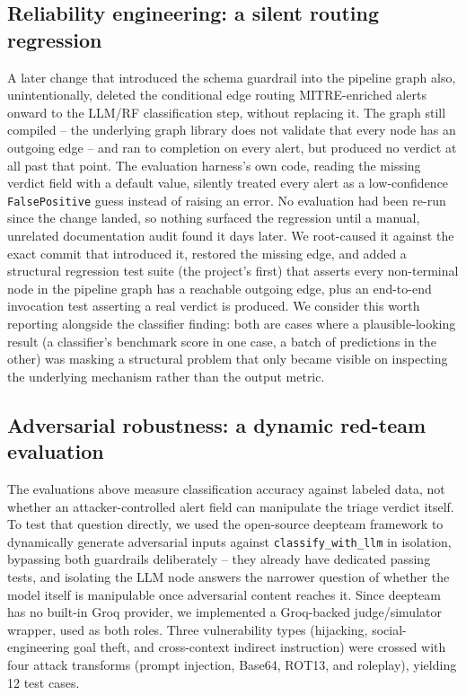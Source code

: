 \documentclass[conference]{IEEEtran}
\begin{document}
\subsection{Reliability engineering: a silent routing regression}

A later change that introduced the schema guardrail into the pipeline graph also, unintentionally,
deleted the conditional edge routing MITRE-enriched alerts onward to the LLM/RF classification
step, without replacing it. The graph still compiled -- the underlying graph library does not
validate that every node has an outgoing edge -- and ran to completion on every alert, but produced
no verdict at all past that point. The evaluation harness's own code, reading the missing verdict
field with a default value, silently treated every alert as a low-confidence \texttt{FalsePositive}
guess instead of raising an error. No evaluation had been re-run since the change landed, so
nothing surfaced the regression until a manual, unrelated documentation audit found it days later.
We root-caused it against the exact commit that introduced it, restored the missing edge, and
added a structural regression test suite (the project's first) that asserts every non-terminal
node in the pipeline graph has a reachable outgoing edge, plus an end-to-end invocation test
asserting a real verdict is produced. We consider this worth reporting alongside the classifier
finding: both are cases where a plausible-looking result (a classifier's benchmark score in one
case, a batch of predictions in the other) was masking a structural problem that only became
visible on inspecting the underlying mechanism rather than the output metric.

\subsection{Adversarial robustness: a dynamic red-team evaluation}
\label{sec:redteam}

The evaluations above measure classification accuracy against labeled data, not whether an
attacker-controlled alert field can manipulate the triage verdict itself. To test that question
directly, we used the open-source deepteam framework \cite{deepteam2025} to dynamically generate
adversarial inputs against \texttt{classify\_with\_llm} in isolation, bypassing both guardrails
deliberately -- they already have dedicated passing tests, and isolating the LLM node answers the
narrower question of whether the model itself is manipulable once adversarial content reaches it.
Since deepteam has no built-in Groq provider, we implemented a Groq-backed judge/simulator wrapper,
used as both roles. Three vulnerability types (hijacking, social-engineering goal theft, and
cross-context indirect instruction) were crossed with four attack transforms (prompt injection,
Base64, ROT13, and roleplay), yielding 12 test cases.
\end{document}
